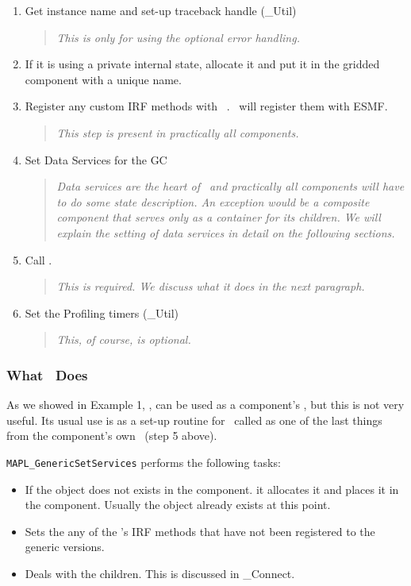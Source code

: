 \begin{enumerate}

\item Get instance name and set-up traceback handle  (\ggn _Util)
\begin{quote} 
{\em This is only for using the optional error handling.}
\end{quote}
%
\item If it is using a private internal state, allocate it and put it
  in the gridded component with a unique name.
%
\item Register any custom IRF methods with \ggn\ . \ggn\  will register
them with ESMF.
\begin{quote}
{\em This step is present in practically all components.}
\end{quote}
%
\item Set Data Services for the GC
\begin{quote} {\em Data services are the heart of \ggn\  and practically all 
 components will have to do some state description. An exception would be
 a composite component that serves only as a container for its
 children. We will explain the setting of data services in detail on
 the following sections. }  \end{quote}
%
\item Call \gssv.
\begin{quote} 
{\em This is required. We discuss what it does in the next paragraph.}
\end{quote}
%
\item Set the Profiling timers (\ggn _Util)
\begin{quote} {\em This, of course, is optional.}  \end{quote}
\end{enumerate}

\subsubsection{What \gssv\  Does}

 As we showed in Example 1, \gssv, can be used as a component's \ssv,
 but this is not very useful. Its usual use is as a set-up routine 
 for \ggn\  called as one of the last things from the component's 
 own \ssv\ (step 5 above).

 {\tt MAPL\_GenericSetServices} performs the following tasks:
%
\begin{itemize}
%
\item
If the \ggn  object does not exists in the component.  it
  allocates it and places it in the component.
  Usually the object already exists at this point.
%
\item
  Sets the any of the \egc's IRF methods that have not been
  registered to the generic versions.
%
\item
  Deals with the children. This is discussed in \ggn _Connect.
\end{itemize}

